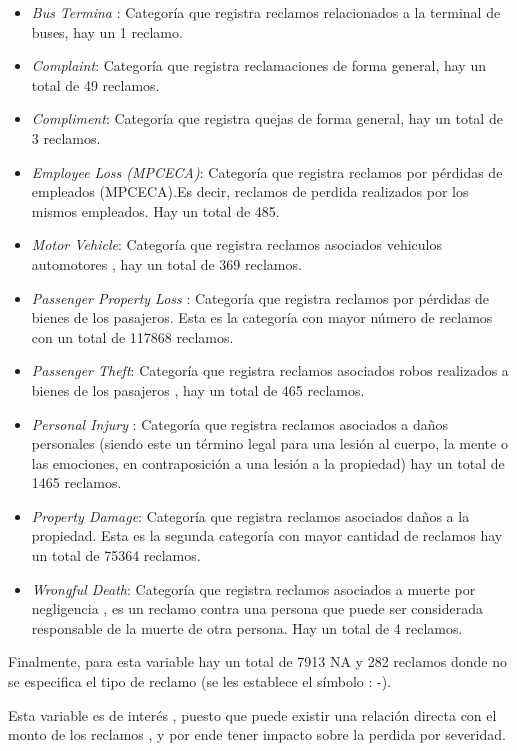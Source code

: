 \documentclass[
  letterpaper,
  onepage,
  openany]{scrreprt}
\begin{document}
\begin{itemize}
\item
  \emph{Bus Termina} : Categoría que registra reclamos relacionados a la
  terminal de buses, hay un 1 reclamo.
\item
  \emph{Complaint}: Categoría que registra reclamaciones de forma
  general, hay un total de 49 reclamos.
\item
  \emph{Compliment}: Categoría que registra quejas de forma general, hay
  un total de 3 reclamos.
\item
  \emph{Employee Loss (MPCECA)}: Categoría que registra reclamos por
  pérdidas de empleados (MPCECA).Es decir, reclamos de perdida
  realizados por los mismos empleados. Hay un total de 485.
\item
  \emph{Motor Vehicle}: Categoría que registra reclamos asociados
  vehiculos automotores , hay un total de 369 reclamos.
\item
  \emph{Passenger Property Loss} : Categoría que registra reclamos por
  pérdidas de bienes de los pasajeros. Esta es la categoría con mayor
  número de reclamos con un total de 117868 reclamos.
\item
  \emph{Passenger Theft}: Categoría que registra reclamos asociados
  robos realizados a bienes de los pasajeros , hay un total de 465
  reclamos.
\item
  \emph{Personal Injury} : Categoría que registra reclamos asociados a
  daños personales (siendo este un término legal para una lesión al
  cuerpo, la mente o las emociones, en contraposición a una lesión a la
  propiedad) hay un total de 1465 reclamos.
\item
  \emph{Property Damage}: Categoría que registra reclamos asociados
  daños a la propiedad. Esta es la segunda categoría con mayor cantidad
  de reclamos hay un total de 75364 reclamos.
\item
  \emph{Wrongful Death}: Categoría que registra reclamos asociados a
  muerte por negligencia , es un reclamo contra una persona que puede
  ser considerada responsable de la muerte de otra persona. Hay un total
  de 4 reclamos.
\end{itemize}

Finalmente, para esta variable hay un total de 7913 NA y 282 reclamos
donde no se especifica el tipo de reclamo (se les establece el símbolo :
-).

Esta variable es de interés , puesto que puede existir una relación
directa con el monto de los reclamos , y por ende tener impacto sobre la
perdida por severidad.
\end{document}
